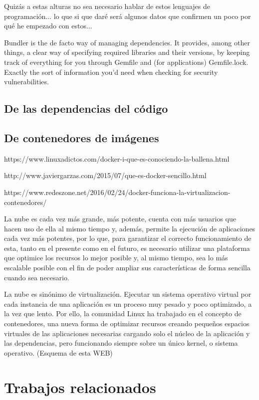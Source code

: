 
Quizás a estas alturas no sea necesario hablar de estos lenguajes de programación... lo que si que daré será algunos datos que confirmen un poco por qué he empezado con estos...


Bundler is the de facto way of managing dependencies. It provides, among other things, a clear way of specifying required libraries and their versions, by keeping track of everything for you through Gemfile and (for applications) Gemfile.lock. Exactly the sort of information you’d need when checking for security vulnerabilities.

\subsection{De las dependencias del código}


\subsection{De contenedores de imágenes}


https://www.linuxadictos.com/docker-i-que-es-conociendo-la-ballena.html

http://www.javiergarzas.com/2015/07/que-es-docker-sencillo.html

https://www.redeszone.net/2016/02/24/docker-funciona-la-virtualizacion-contenedores/


La nube es cada vez más grande, más potente, cuenta con más usuarios que hacen uso de ella al mismo tiempo y, además, permite la ejecución de aplicaciones cada vez más potentes, por lo que, para garantizar el correcto funcionamiento de esta, tanto en el presente como en el futuro, es necesario utilizar una plataforma que optimice los recursos lo mejor posible y, al mismo tiempo, sea lo más escalable posible con el fin de poder ampliar sus características de forma sencilla cuando sea necesario.

La nube es sinónimo de virtualización. Ejecutar un sistema operativo virtual por cada instancia de una aplicación es un proceso muy pesado y poco optimizado, a la vez que lento. Por ello, la comunidad Linux ha trabajado en el concepto de contenedores, una nueva forma de optimizar recursos creando pequeños espacios virtuales de las aplicaciones necesarias cargando solo el núcleo de la aplicación y las dependencias, pero funcionando siempre sobre un único kernel, o sistema operativo. (Esquema de esta WEB)

\section{Trabajos relacionados}

\endinput